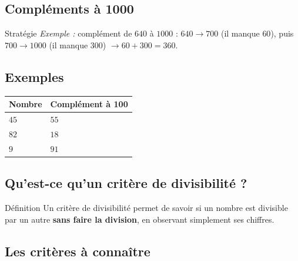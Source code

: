 \vspace{10pt}
\subsection{Compléments à 1000}

\begin{astuce}{Stratégie}
\textit{Exemple :} complément de $640$ à $1000$ : $640 \to 700$ (il manque $60$), puis $700 \to 1000$ (il manque $300$) $\to 60 + 300 = 360$.
\end{astuce}

\vspace{10pt}
\subsection{Exemples}

\def\arraystretch{1.2}
\begin{tabularx}{\linewidth}{|X|X|}
\hline
\cellcolor{themeNO!30}\textbf{Nombre} & \cellcolor{themeNO!30}\textbf{Complément à 100} \\\hline
$45$ & $55$ \\\hline
$82$ & $18$ \\\hline
$9$ & $91$ \\\hline
\end{tabularx}
\def\arraystretch{1}


\newpage
\semaineinvisible
{} 

\vfill
\subsection{Qu'est-ce qu'un critère de divisibilité ?}

\begin{regle}{Définition}
Un critère de divisibilité permet de savoir si un nombre est divisible par un autre \textbf{sans faire la division}, en observant simplement ses chiffres.
\end{regle}

\vspace{10pt}
\subsection{Les critères à connaître}

